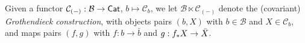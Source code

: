 \documentclass[a4paper,10pt
,draft
]{article}%
\renewcommand{\1}{\eta}%
\begin{document}
      
\begin{notation}
      Given a functor $\mathcal C_{(-)}: \mathcal B \to \mathsf{Cat}$, $b \mapsto \mathcal C_b$, we let
      $\mathcal B \ltimes \mathcal C_{(-)}$ denote the (covariant) \textit{Grothendieck construction},
      with objects pairs $(b,X)$ with $b \in \mathcal B$ and $X \in \mathcal C_b$, and
      maps pairs $(f,g)$ with $f: b \to \bar b$ and $g: f_{\**}X \to \bar X$.
\end{notation}
\end{document}
